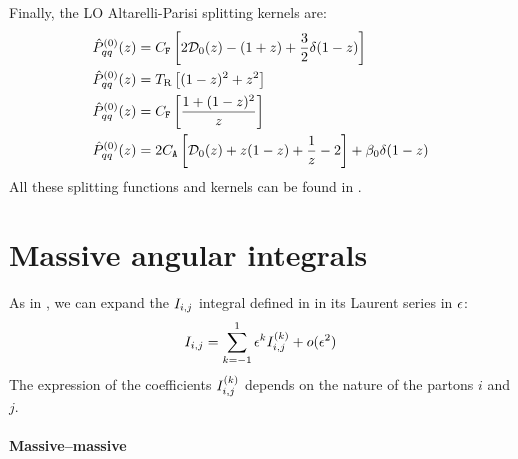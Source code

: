 Finally, the LO Altarelli-Parisi splitting kernels are:
\begin{align}
  \hat{P}^{(0)}_{qq}(z) & = C_\mathtt{F} \left[ 2 \mathcal{D}_0(z) - (1 + z) + \frac{3}{2} \delta(1 - z) \right] \\
  \hat{P}^{(0)}_{qq}(z) & = T_\text{R} \left[ (1 - z)^2 + z^2 \right] \\
  \hat{P}^{(0)}_{qq}(z) & = C_\mathtt{F} \left[ \frac{1 + (1 - z)^2}{z} \right] \\
  \hat{P}^{(0)}_{qq}(z) & = 2 C_\mathtt{A} \left[ \mathcal{D}_0(z) + z (1 - z) + \frac{1}{z} - 2 \right] + \beta_0 \delta(1 - z)
\end{align}
All these splitting functions and kernels can be found in \cite{Ellis-1996}.

\section{Massive angular integrals}
\label{sec:mass-int}

As in \cite{Behring-2020}, we can expand the $ I_{i,j} $ integral defined in  in its Laurent series in $ \epsilon $:
\begin{equation}
  I_{i,j} = \sum_{k = -1}^1 \epsilon^k I_{i,j}^{(k)} + o(\epsilon^2)
\end{equation}
The expression of the coefficients $ I_{i,j}^{(k)} $ depends on the nature of the partons $ i $ and $ j $.

\paragraph{Massive--massive}

